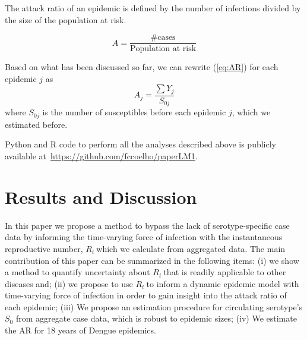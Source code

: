 \documentclass[10pt]{article}
\def \rr {$R_{t}\:$}
\begin{document}
The attack ratio of an epidemic is defined by the number of infections divided 
by the size of the population at risk.

\begin{equation}
\label{eq:AR}
A=\frac{\text{\# cases}}{\text{Population at risk}} 
\end{equation}

Based on what has been discussed so far, we can rewrite (\ref{eq:AR}) for 
each epidemic $j$ as
\begin{equation}
\label{eq:AR2}
 A_{j}=\frac{\sum Y_j}{S_{0j}}
\end{equation}
where $S_{0j}$ is the number of susceptibles before each epidemic $j$, which we
estimated before.

Python and R code to perform all the analyses described above is publicly 
available at~\url{https://github.com/fccoelho/paperLM1}.

\section*{Results and Discussion}

In this paper we propose a method to bypass the lack of serotype-specific case 
data by informing the time-varying force of infection with the instantaneous 
reproductive number, \rr which we calculate from aggregated data.
The main contribution of this paper can be summarized in the following items: 
(i) we show a method to quantify uncertainty 
about \rr that is readily applicable to other diseases and; (ii) we propose to 
use \rr to inform a dynamic epidemic model with time-varying force of infection 
in order to gain insight into the attack ratio of each epidemic; (iii) We 
propose an estimation procedure for circulating serotype's $S_0$ from 
aggregate case data, which is robust to epidemic sizes; (iv) We estimate the AR 
for 18 years of Dengue epidemics. 
\end{document}
